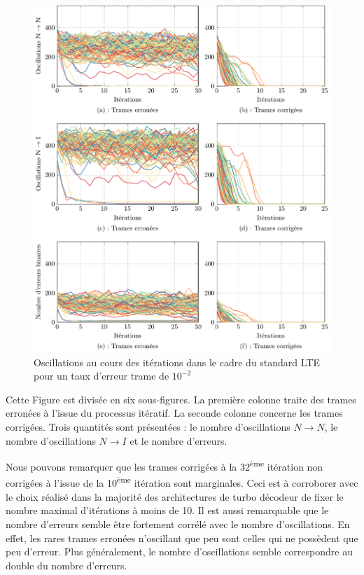 \begin{figure}[!tb]
	\hspace*{-.7cm}
	\includegraphics[]{main/ch2_fig/tikz/it_lte10-2.pdf}
	\caption{Oscillations au cours des itérations dans le cadre du standard LTE pour un taux d'erreur trame de $10^{-2}$ \label{ch2:fig:it_lte_1}}
\end{figure}

Cette Figure est divisée en six sous-figures. La première colonne traite des trames erronées à l'issue du processus 
itératif. La seconde colonne concerne les trames corrigées. Trois quantités sont présentées : le nombre d'oscillations 
$N\rightarrow N$, le nombre d'oscillations $N\rightarrow I$ et le nombre d'erreurs.

Nous pouvons remarquer que les trames corrigées à la 32\textsuperscript{ème} itération non corrigées à l'issue de la 
10\textsuperscript{ème} itération sont marginales. Ceci est à corroborer avec le choix réalisé dans la majorité des 
architectures de turbo décodeur de fixer le nombre maximal d'itérations à moins de 10.
Il est aussi remarquable que le nombre d'erreurs semble être fortement corrélé avec le nombre d'oscillations. En effet, 
les rares trames erronées n'oscillant que peu sont celles qui ne possèdent que peu d'erreur. Plus généralement,
le nombre d'oscillations semble correspondre au double du nombre d'erreurs.

